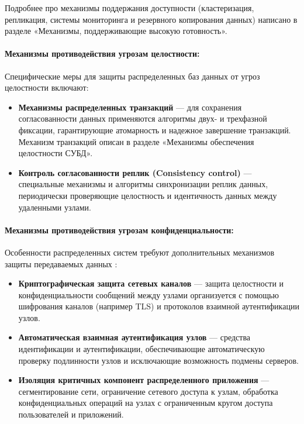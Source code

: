 Подробнее про механизмы поддержания доступности (кластеризация, репликация, системы мониторинга и резервного копирования данных) написано в разделе «Механизмы, поддерживающие высокую готовность».

\paragraph{Механизмы противодействия угрозам целостности:}

Специфические меры для защиты распределенных баз данных от угроз целостности включают:

\begin{itemize} 
    \item \textbf{Механизмы распределенных транзакций} — для сохранения согласованности данных применяются алгоритмы двух- и трехфазной фиксации, гарантирующие атомарность и надежное завершение транзакций. Механизм транзакций описан в разделе «Механизмы обеспечения целостности СУБД».
    \item \textbf{Контроль согласованности реплик (Consistency control)} — специальные механизмы и алгоритмы синхронизации реплик данных, периодически проверяющие целостность и идентичность данных между удаленными узлами.
\end{itemize}

\paragraph{Механизмы противодействия угрозам конфиденциальности:}

Особенности распределенных систем требуют дополнительных механизмов защиты передаваемых данных \autocite[гл. Защита]{Tanenbaum}:

\begin{itemize} 
    \item \textbf{Криптографическая защита сетевых каналов} — защита целостности и конфиденциальности сообщений между узлами организуется с помощью шифрования каналов (например TLS) и протоколов взаимной аутентификации узлов.
    \item \textbf{Автоматическая взаимная аутентификация узлов} — средства идентификации и аутентификации, обеспечивающие автоматическую проверку подлинности узлов и исключающие возможность подмены серверов.
    \item \textbf{Изоляция критичных компонент распределенного приложения} — сегментирование сети, ограничение сетевого доступа к узлам, обработка конфиденциальных операций на узлах с ограниченным кругом доступа пользователей и приложений.
\end{itemize}

